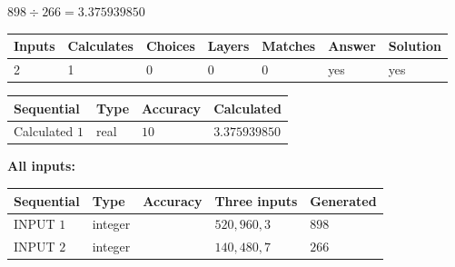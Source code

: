 \documentclass{ctexart}
\begin{document}
 

$ %
898 \div  %
266=   %
3.375939850$
 
 
\noindent{}
 
 

 
   
   
   
   
\noindent\begin{tabular}{|l|l|l|l|l|l|l|}
 \hline
Inputs & Calculates & Choices & Layers & Matches & Answer & Solution \\ \hline
 2  & 
 1  & 
 0
  & 
 0  & 
 0  & 
  yes & 
  yes 
  \\ \hline
 \end{tabular}
   
   
   
   
\noindent{}
   
   
  
  
\noindent\begin{tabular}{|l|l|l|l|}
\hline
 Sequential & Type & Accuracy & Calculated \\ 
\hline
 
 
  Calculated $  1 $ & real & $  10  $ & 
 $ 3.375939850 $ 
 \\  \hline  
 \end{tabular}
   
   
   
   
\noindent\vspace{0.1in}\hspace{-0.08in} {\textbf{\Large{All inputs: }}}
   
   
  
  
\noindent\begin{tabular}{|l|l|l|l|l|}
\hline
 Sequential & Type & Accuracy & Three inputs & Generated \\ 
\hline
 
 
  INPUT $  1 $ & integer &  & $
 520
 , 
 960
 , 
 3
 $ & $ 898 $ 
 \\  \hline  
 
 
  INPUT $  2 $ & integer &  & $
 140
 , 
 480
 , 
 7
 $ & $ 266 $ 
 \\  \hline  
 \end{tabular}
   
   
  
\vspace{0.2in}
  
\end{document}

